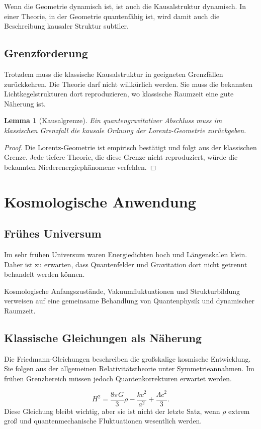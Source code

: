 \documentclass[11pt,a4paper,openany]{book}
\newtheorem{lemma}{Lemma}[chapter]
\theoremstyle{remark}
\begin{document}
Wenn die Geometrie dynamisch ist, ist auch die Kausalstruktur dynamisch. In einer Theorie, in der Geometrie quantenfähig ist, wird damit auch die Beschreibung kausaler Struktur subtiler.

\section{Grenzforderung}
Trotzdem muss die klassische Kausalstruktur in geeigneten Grenzfällen zurückkehren. Die Theorie darf nicht willkürlich werden. Sie muss die bekannten Lichtkegelstrukturen dort reproduzieren, wo klassische Raumzeit eine gute Näherung ist.

\begin{lemma}[Kausalgrenze]
Ein quantengravitativer Abschluss muss im klassischen Grenzfall die kausale Ordnung der Lorentz-Geometrie zurückgeben.
\end{lemma}
\begin{proof}
Die Lorentz-Geometrie ist empirisch bestätigt und folgt aus der klassischen Grenze. Jede tiefere Theorie, die diese Grenze nicht reproduziert, würde die bekannten Niederenergiephänomene verfehlen.
\end{proof}

\chapter{Kosmologische Anwendung}
\section{Frühes Universum}
Im sehr frühen Universum waren Energiedichten hoch und Längenskalen klein. Daher ist zu erwarten, dass Quantenfelder und Gravitation dort nicht getrennt behandelt werden können.

Kosmologische Anfangszustände, Vakuumfluktuationen und Strukturbildung verweisen auf eine gemeinsame Behandlung von Quantenphysik und dynamischer Raumzeit.

\section{Klassische Gleichungen als Näherung}
Die Friedmann-Gleichungen beschreiben die großskalige kosmische Entwicklung. Sie folgen aus der allgemeinen Relativitätstheorie unter Symmetrieannahmen. Im frühen Grenzbereich müssen jedoch Quantenkorrekturen erwartet werden.

\begin{equation}
H^2=\frac{8\pi G}{3}\rho-\frac{kc^2}{a^2}+\frac{\Lambda c^2}{3}.
\end{equation}
Diese Gleichung bleibt wichtig, aber sie ist nicht der letzte Satz, wenn $\rho$ extrem groß und quantenmechanische Fluktuationen wesentlich werden.
\end{document}
